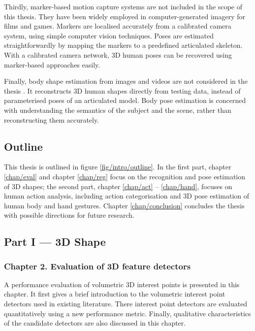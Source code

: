 Thirdly, marker-based motion capture systems are not included in the scope of this thesis. They have been widely employed in computer-generated imagery for films and games. Markers are localised accurately from a calibrated camera system, using simple computer vision techniques. Poses are estimated straightforwardly by mapping the markers to a predefined articulated skeleton.
 With a calibrated camera network, 3D human poses can be recovered using marker-based approaches easily.  

Finally, body shape estimation from images and videos are not considered in the thesis \cite{Guan2009, Rother2009, Chen2011}. It reconstructs 3D human shapes directly from testing data, instead of parameterised poses of an articulated model. Body pose estimation is concerned with understanding the semantics of the subject and the scene, rather than reconstructing them accurately. 

\subsection{Outline}

This thesis is outlined in figure \ref{fig/intro/outline}. In the first part, chapter \ref{chap/eval} and chapter \ref{chap/reg} focus on the recognition and pose estimation of 3D shapes; the second part, chapter \ref{chap/act} -- \ref{chap/hand}, focuses on human action analysis, including action categorisation and 3D pose estimation of human body and hand gestures. Chapter \ref{chap/conclusion} concludes the thesis with possible directions for future research. 

\subsection*{Part I --- 3D Shape}


\subsubsection*{Chapter 2. Evaluation of 3D feature detectors} 
A performance evaluation of volumetric 3D interest points is presented in this chapter. 
It first gives a brief introduction to the volumetric interest point detectors used in existing literature.
There interest point detectors are evaluated quantitatively using a new performance metric.
Finally, qualitative characteristics of the candidate detectors are also discussed in this chapter. 

